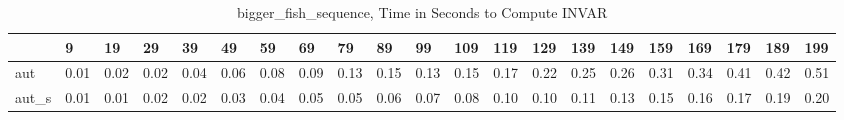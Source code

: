 \begin{table}
\caption{bigger_fish_sequence, Time in Seconds to Compute INVAR}
\label{bigger_fish_sequence_INVAR_time}
\begin{tabular}{lllllllllllllllllllll}
\toprule
 & 9 & 19 & 29 & 39 & 49 & 59 & 69 & 79 & 89 & 99 & 109 & 119 & 129 & 139 & 149 & 159 & 169 & 179 & 189 & 199 \\
\midrule
aut & 0.01 & 0.02 & 0.02 & 0.04 & 0.06 & 0.08 & 0.09 & 0.13 & 0.15 & 0.13 & 0.15 & 0.17 & 0.22 & 0.25 & 0.26 & 0.31 & 0.34 & 0.41 & 0.42 & 0.51 \\
aut_s & 0.01 & 0.01 & 0.02 & 0.02 & 0.03 & 0.04 & 0.05 & 0.05 & 0.06 & 0.07 & 0.08 & 0.10 & 0.10 & 0.11 & 0.13 & 0.15 & 0.16 & 0.17 & 0.19 & 0.20 \\
\bottomrule
\end{tabular}
\end{table}
